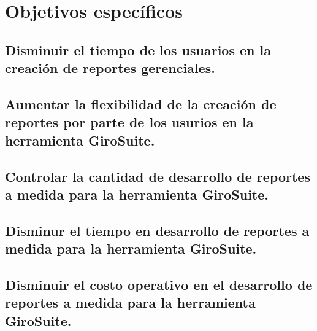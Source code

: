 \section{Objetivos espec\'{i}ficos}
\begin{spacing}{1.5}
	\subsection{Disminuir el tiempo de los usuarios en la creaci\'{o}n de reportes gerenciales.}
	\subsection{Aumentar la flexibilidad de la creaci\'{o}n de reportes por parte de los usurios en la herramienta GiroSuite.}
	\subsection{Controlar la cantidad de desarrollo de reportes a medida para la herramienta GiroSuite.}
	\subsection{Disminur el tiempo en desarrollo de reportes a medida para la herramienta GiroSuite.}
	\subsection{Disminuir el costo operativo en el desarrollo de reportes a medida para la herramienta GiroSuite.}
\end{spacing}


	
